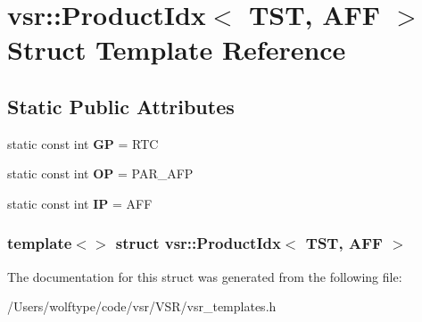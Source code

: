 \hypertarget{structvsr_1_1_product_idx_3_01_t_s_t_00_01_a_f_f_01_4}{\section{vsr\-:\-:Product\-Idx$<$ T\-S\-T, A\-F\-F $>$ Struct Template Reference}
\label{structvsr_1_1_product_idx_3_01_t_s_t_00_01_a_f_f_01_4}
}
\subsection*{Static Public Attributes}
\begin{DoxyCompactItemize}
\item 
\hypertarget{structvsr_1_1_product_idx_3_01_t_s_t_00_01_a_f_f_01_4_a74099d0a2b4523c4c25c46fc788ee837}{static const int {\bfseries G\-P} = R\-T\-C}\label{structvsr_1_1_product_idx_3_01_t_s_t_00_01_a_f_f_01_4_a74099d0a2b4523c4c25c46fc788ee837}

\item 
\hypertarget{structvsr_1_1_product_idx_3_01_t_s_t_00_01_a_f_f_01_4_a4334727bfda3feddc79ec2964230821f}{static const int {\bfseries O\-P} = P\-A\-R\-\_\-\-A\-F\-P}\label{structvsr_1_1_product_idx_3_01_t_s_t_00_01_a_f_f_01_4_a4334727bfda3feddc79ec2964230821f}

\item 
\hypertarget{structvsr_1_1_product_idx_3_01_t_s_t_00_01_a_f_f_01_4_ad0e9f5c28b5cbe188a021036252e36d9}{static const int {\bfseries I\-P} = A\-F\-F}\label{structvsr_1_1_product_idx_3_01_t_s_t_00_01_a_f_f_01_4_ad0e9f5c28b5cbe188a021036252e36d9}

\end{DoxyCompactItemize}
\subsubsection*{template$<$$>$ struct vsr\-::\-Product\-Idx$<$ T\-S\-T, A\-F\-F $>$}



The documentation for this struct was generated from the following file\-:\begin{DoxyCompactItemize}
\item 
/\-Users/wolftype/code/vsr/\-V\-S\-R/vsr\-\_\-templates.\-h\end{DoxyCompactItemize}
